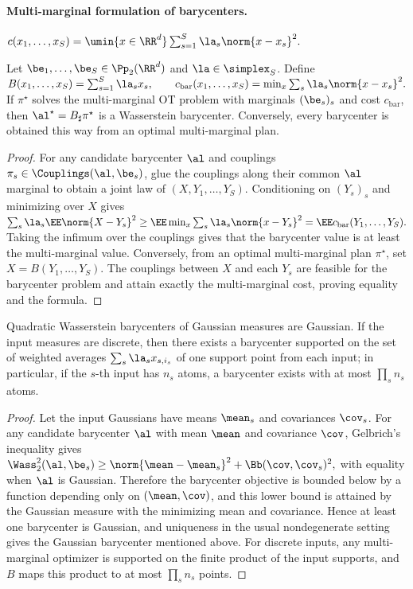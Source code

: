\paragraph{Multi-marginal formulation of barycenters.}
\(c(x_1,\ldots,x_S) = \umin{x \in \RR^d} \sum_{s=1}^S \la_s \norm{x-x_s}^2.\)
\begin{prop}\label{prop-multimarginal-barycenter}
Let $\be_1,\ldots,\be_S\in\Pp_2(\RR^d)$ and $\la\in\simplex_S$. Define
\(B(x_1,\ldots,x_S)=\sum_{s=1}^S\la_s x_s, \qquad c_{\mathrm{bar}}(x_1,\ldots,x_S)=\min_x\sum_s\la_s\norm{x-x_s}^2.\)
If $\pi^\star$ solves the multi-marginal OT problem with marginals $(\be_s)_s$ and cost $c_{\mathrm{bar}}$, then $\al^\star=B_\sharp\pi^\star$ is a Wasserstein barycenter. Conversely, every barycenter is obtained this way from an optimal multi-marginal plan.
\end{prop}
\begin{proof}
For any candidate barycenter $\al$ and couplings $\pi_s\in\Couplings(\al,\be_s)$, glue the couplings along their common $\al$ marginal to obtain a joint law of $(X,Y_1,\ldots,Y_S)$. Conditioning on $(Y_s)_s$ and minimizing over $X$ gives
\(\sum_s\la_s\EE\norm{X-Y_s}^2 \geq \EE\min_x\sum_s\la_s\norm{x-Y_s}^2 = \EE c_{\mathrm{bar}}(Y_1,\ldots,Y_S).\)
Taking the infimum over the couplings gives that the barycenter value is at least the multi-marginal value. Conversely, from an optimal multi-marginal plan $\pi^\star$, set $X=B(Y_1,\ldots,Y_S)$. The couplings between $X$ and each $Y_s$ are feasible for the barycenter problem and attain exactly the multi-marginal cost, proving equality and the formula.
\end{proof}
\begin{cor}\label{cor-gaussian-discrete-barycenters}
Quadratic Wasserstein barycenters of Gaussian measures are Gaussian. If the input measures are discrete, then there exists a barycenter supported on the set of weighted averages $\sum_s\la_s x_{s,i_s}$ of one support point from each input; in particular, if the $s$-th input has $n_s$ atoms, a barycenter exists with at most $\prod_s n_s$ atoms.
\end{cor}
\begin{proof}
Let the input Gaussians have means $\mean_s$ and covariances $\cov_s$. For any candidate barycenter $\al$ with mean $\mean$ and covariance $\cov$, Gelbrich's inequality gives
\(\Wass_2^2(\al,\be_s) \geq \norm{\mean-\mean_s}^2+\Bb(\cov,\cov_s)^2,\)
with equality when $\al$ is Gaussian. Therefore the barycenter objective is bounded below by a function depending only on $(\mean,\cov)$, and this lower bound is attained by the Gaussian measure with the minimizing mean and covariance. Hence at least one barycenter is Gaussian, and uniqueness in the usual nondegenerate setting gives the Gaussian barycenter mentioned above. For discrete inputs, any multi-marginal optimizer is supported on the finite product of the input supports, and $B$ maps this product to at most $\prod_s n_s$ points.
\end{proof}

